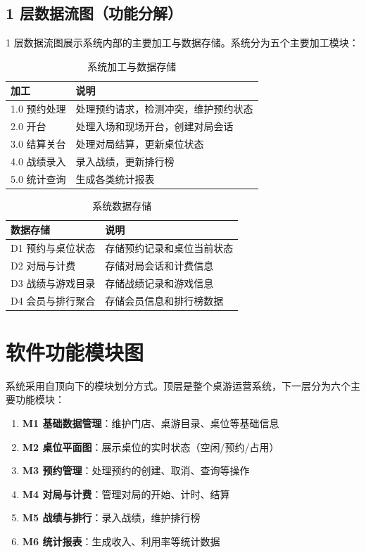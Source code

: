 \subsection{1 层数据流图（功能分解）}

1 层数据流图展示系统内部的主要加工与数据存储。系统分为五个主要加工模块：

\begin{table}[H]
  \centering
  \caption{系统加工与数据存储}
  \label{tab:dfd1}
  \begin{tabularx}{\textwidth}{|l|X|}
    \hline
    \textbf{加工} & \textbf{说明} \\
    \hline
    1.0 预约处理 & 处理预约请求，检测冲突，维护预约状态 \\
    \hline
    2.0 开台 & 处理入场和现场开台，创建对局会话 \\
    \hline
    3.0 结算关台 & 处理对局结算，更新桌位状态 \\
    \hline
    4.0 战绩录入 & 录入战绩，更新排行榜 \\
    \hline
    5.0 统计查询 & 生成各类统计报表 \\
    \hline
  \end{tabularx}
\end{table}

\begin{table}[H]
  \centering
  \caption{系统数据存储}
  \label{tab:dfd1_data}
  \begin{tabularx}{\textwidth}{|l|X|}
    \hline
    \textbf{数据存储} & \textbf{说明} \\
    \hline
    D1 预约与桌位状态 & 存储预约记录和桌位当前状态 \\
    \hline
    D2 对局与计费 & 存储对局会话和计费信息 \\
    \hline
    D3 战绩与游戏目录 & 存储战绩记录和游戏信息 \\
    \hline
    D4 会员与排行聚合 & 存储会员信息和排行榜数据 \\
    \hline
  \end{tabularx}
\end{table}

\section{软件功能模块图}

系统采用自顶向下的模块划分方式。顶层是整个桌游运营系统，下一层分为六个主要功能模块：

\begin{enumerate}
  \item \textbf{M1 基础数据管理}：维护门店、桌游目录、桌位等基础信息
  \item \textbf{M2 桌位平面图}：展示桌位的实时状态（空闲/预约/占用）
  \item \textbf{M3 预约管理}：处理预约的创建、取消、查询等操作
  \item \textbf{M4 对局与计费}：管理对局的开始、计时、结算
  \item \textbf{M5 战绩与排行}：录入战绩，维护排行榜
  \item \textbf{M6 统计报表}：生成收入、利用率等统计数据
\end{enumerate}

